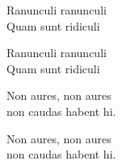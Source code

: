 \vspace{10pt}
Ranunculi ranunculi\\
Quam sunt ridiculi\par
\vspace{10pt}
Ranunculi ranunculi\\
Quam sunt ridiculi\par
\vspace{10pt}
Non aures, non aures\\
non caudas habent hi.\par
\vspace{10pt}
Non aures, non aures\\
non caudas habent hi.
